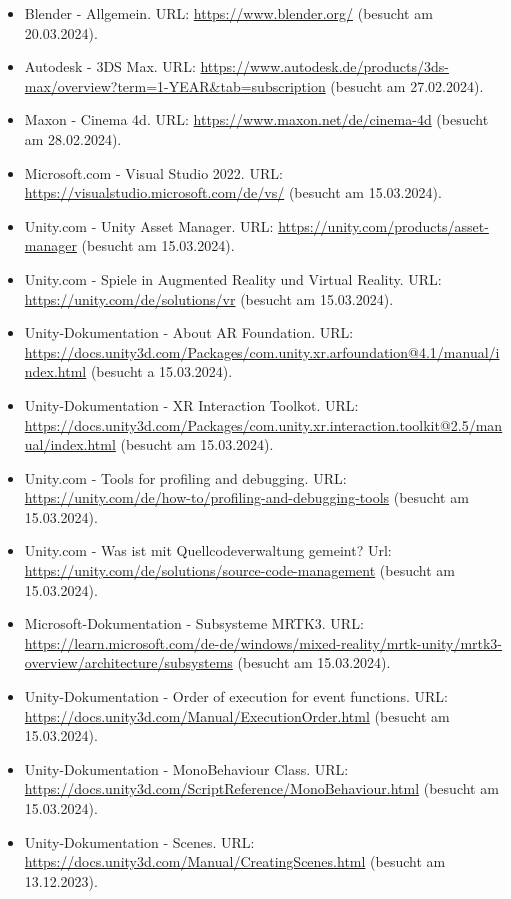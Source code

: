 \begin{itemize}
    \item Blender - Allgemein. URL: \url{https://www.blender.org/} (besucht am 20.03.2024).
    \item Autodesk - 3DS Max. URL: \url{https://www.autodesk.de/products/3ds-max/overview?term=1-YEAR&tab=subscription} (besucht am 27.02.2024).
    \item Maxon - Cinema 4d. URL: \url{https://www.maxon.net/de/cinema-4d} (besucht am 28.02.2024).
    \item Microsoft.com - Visual Studio 2022. URL: \url{https://visualstudio.microsoft.com/de/vs/} (besucht am 15.03.2024).
    \item Unity.com - Unity Asset Manager. URL: \url{https://unity.com/products/asset-manager} (besucht am 15.03.2024).
    \item Unity.com - Spiele in Augmented Reality und Virtual Reality. URL: \url{https://unity.com/de/solutions/vr} (besucht am 15.03.2024).
    \item Unity-Dokumentation - About AR Foundation. URL: \url{https://docs.unity3d.com/Packages/com.unity.xr.arfoundation@4.1/manual/index.html} (besucht a 15.03.2024).
    \item Unity-Dokumentation - XR Interaction Toolkot. URL: \url{https://docs.unity3d.com/Packages/com.unity.xr.interaction.toolkit@2.5/manual/index.html} (besucht am 15.03.2024).
    \item Unity.com - Tools for profiling and debugging. URL: \url{https://unity.com/de/how-to/profiling-and-debugging-tools} (besucht am 15.03.2024).
    \item Unity.com - Was ist mit Quellcodeverwaltung gemeint? Url: \url{https://unity.com/de/solutions/source-code-management} (besucht am 15.03.2024).
    \item Microsoft-Dokumentation - Subsysteme MRTK3. URL: \url{https://learn.microsoft.com/de-de/windows/mixed-reality/mrtk-unity/mrtk3-overview/architecture/subsystems} (besucht am 15.03.2024).
    \item Unity-Dokumentation - Order of execution for event functions. URL: \url{https://docs.unity3d.com/Manual/ExecutionOrder.html} (besucht am 15.03.2024).
    \item Unity-Dokumentation - MonoBehaviour Class. URL: \url{https://docs.unity3d.com/ScriptReference/MonoBehaviour.html} (besucht am 15.03.2024).
    \item Unity-Dokumentation - Scenes. URL: \url{https://docs.unity3d.com/Manual/CreatingScenes.html} (besucht am 13.12.2023).

\end{itemize}
